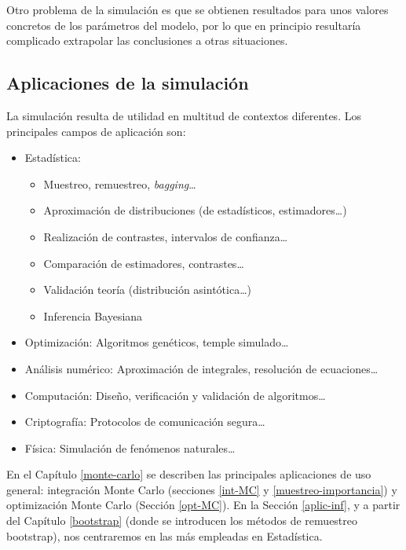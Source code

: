 \documentclass[
  spanish,
  10pt,
]{book}
\theoremstyle{break}
\theoremstyle{nonumberplain}
\begin{document}
Otro problema de la simulación es que se obtienen resultados para unos valores concretos de los parámetros del modelo, por lo que en principio
resultaría complicado extrapolar las conclusiones a otras situaciones.

\subsection{Aplicaciones de la simulación}\label{aplicaciones-de-la-simulaciuxf3n}

La simulación resulta de utilidad en multitud de contextos diferentes.
Los principales campos de aplicación son:

\begin{itemize}
\item
  Estadística:

  \begin{itemize}
  \item
    Muestreo, remuestreo, \emph{bagging}\ldots{}
  \item
    Aproximación de distribuciones (de estadísticos, estimadores\ldots)
  \item
    Realización de contrastes, intervalos de confianza\ldots{}
  \item
    Comparación de estimadores, contrastes\ldots{}
  \item
    Validación teoría (distribución asintótica\ldots)
  \item
    Inferencia Bayesiana
  \end{itemize}
\item
  Optimización: Algoritmos genéticos, temple simulado\ldots{}
\item
  Análisis numérico: Aproximación de integrales, resolución de ecuaciones\ldots{}
\item
  Computación: Diseño, verificación y validación de algoritmos\ldots{}
\item
  Criptografía: Protocolos de comunicación segura\ldots{}
\item
  Física: Simulación de fenómenos naturales\ldots{}
\end{itemize}

En el Capítulo \ref{monte-carlo} se describen las principales aplicaciones de uso general: integración Monte Carlo (secciones \ref{int-MC} y \ref{muestreo-importancia}) y optimización Monte Carlo (Sección \ref{opt-MC}).
En la Sección \ref{aplic-inf}, y a partir del Capítulo \ref{bootstrap} (donde se introducen los métodos de remuestreo bootstrap), nos centraremos en las más empleadas en Estadística.
\end{document}
